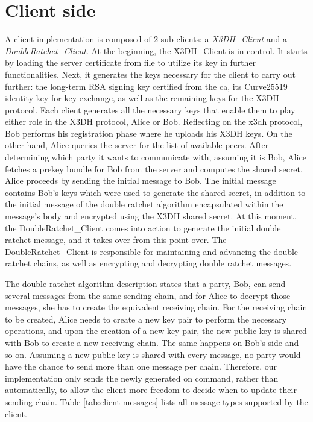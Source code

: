 \section{Client side}
A client implementation is composed of 2 sub-clients: a \textit{X3DH\_Client} and a \textit{DoubleRatchet\_Client}. 
At the beginning, the X3DH\_Client is in control. It starts by loading the server certificate from file to utilize its key in further functionalities. Next, it generates the keys necessary for the client to carry out further: the long-term RSA signing key certified from the \gls{ca}, its Curve25519 identity key for key exchange, as well as the remaining keys for the X3DH protocol. Each client generates all the necessary keys that enable them to play either role in the X3DH protocol, Alice or Bob. Reflecting on the \gls{x3dh} protocol, Bob performs his registration phase where he uploads his X3DH keys. On the other hand, Alice queries the server for the list of available peers. After determining which party it wants to communicate with, assuming it is Bob, Alice fetches a prekey bundle for Bob from the server and computes the shared secret. Alice proceeds by sending the initial message to Bob. The initial message contains Bob's keys which were used to generate the shared secret, in addition to the initial message of the double ratchet algorithm encapsulated within the message's body and encrypted using the X3DH shared secret.
At this moment, the DoubleRatchet\_Client comes into action to generate the initial double ratchet message, and it takes over from this point over. The DoubleRatchet\_Client is responsible for maintaining and advancing the double ratchet chains, as well as  encrypting and decrypting double ratchet messages. 
\par
The double ratchet algorithm description states that a party, Bob, can send several messages from the same sending chain, and for Alice to decrypt those messages, she has to create the equivalent receiving chain. For the receiving chain to be created, Alice needs to create a new key pair to perform the necessary operations, and upon the creation of a new key pair, the new public key is shared with Bob to create a new receiving chain. The same happens on Bob's side and so on. Assuming a new public key is shared with every message, no party would have the chance to send more than one message per chain. Therefore, our implementation only sends the newly generated on command, rather than automatically, to allow the client more freedom to decide when to update their sending chain.
Table \ref{tab:client-messages} lists all message types supported by the client.
